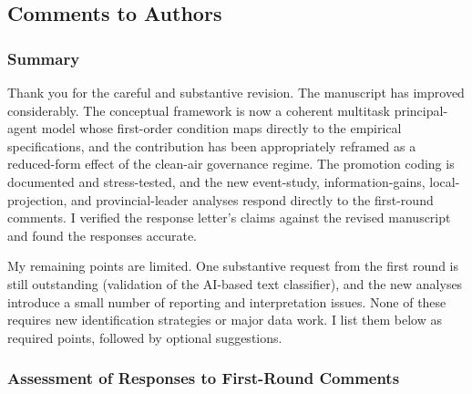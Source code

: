 \documentclass[
  11pt,
]{article}
\begin{document}
\subsection{Comments to Authors}\label{comments-to-authors}

\subsubsection{Summary}\label{summary}

Thank you for the careful and substantive revision. The manuscript has
improved considerably. The conceptual framework is now a coherent
multitask principal-agent model whose first-order condition maps
directly to the empirical specifications, and the contribution has been
appropriately reframed as a reduced-form effect of the clean-air
governance regime. The promotion coding is documented and stress-tested,
and the new event-study, information-gains, local-projection, and
provincial-leader analyses respond directly to the first-round comments.
I verified the response letter's claims against the revised manuscript
and found the responses accurate.

My remaining points are limited. One substantive request from the first
round is still outstanding (validation of the AI-based text classifier),
and the new analyses introduce a small number of reporting and
interpretation issues. None of these requires new identification
strategies or major data work. I list them below as required points,
followed by optional suggestions.

\subsubsection{Assessment of Responses to First-Round
Comments}\label{assessment-of-responses-to-first-round-comments}
\end{document}
